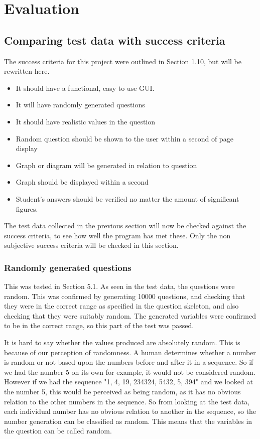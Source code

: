 \chapter{Evaluation }
\section{Comparing test data with success criteria}
The success criteria for this project were outlined in Section 1.10, but will be rewritten here.
\begin{itemize}
	\item It should have a functional, easy to use GUI.
	\item It will have randomly generated questions
	\item It should have realistic values in the question
	\item Random question should be shown to the user within a second of page display
	\item Graph or diagram will be generated in relation to question
	\item Graph should be displayed within a second
	\item Student's answers should be verified no matter the amount of significant figures.
\end{itemize}
The test data collected in the previous section will now be checked against the success criteria, to see how well the program has met these. Only the non subjective success criteria will be checked in this section.
\subsection{Randomly generated questions}
This was tested in Section 5.1. As seen in the test data, the questions were random. This was confirmed by generating 10000 questions, and checking that they were in the correct range as specified in the question skeleton, and also checking that they were suitably random. The generated variables were confirmed to be in the correct range, so this part of the test was passed. 

It is hard to say whether the values produced are absolutely random. This is because of our perception of randomness. A human determines whether a number is random or not based upon the numbers before and after it in a sequence. So if we had the number 5 on its own for example, it would not be considered random. However if we had the sequence "1, 4, 19, 234324, 5432, 5, 394" and we looked at the number 5, this would be perceived as being random, as it has no obvious relation to the other numbers in the sequence. So from looking at the test data, each individual number has no obvious relation to another in the sequence, so the number generation can be classified as random. This means that the variables in the question can be called random.

